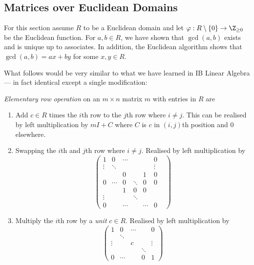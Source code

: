 \documentclass[a4paper]{article}
\theoremstyle{definition}
\begin{document}
\subsection{Matrices over Euclidean Domains}

For this section assume \(R\) to be a Euclidean domain and let \(\varphi: R \setminus \{0\} \to \Z_{\geq 0}\) be the Euclidean function. For \(a, b \in R\), we have shown that \(\gcd(a, b)\) exists and is unique up to associates. In addition, the Euclidean algorithm shows that \(\gcd(a, b) = ax + by\) for some \(x, y \in R\).

What follows would be very similar to what we have learned in IB Linear Algebra --- in fact identical except a single modification:

\begin{definition}
  \emph{Elementary row operation} on an \(m \times n\) matrix \(m\) with entries in \(R\) are
  \begin{enumerate}
  \item Add \(c \in R\) times the \(i\)th row to the \(j\)th row where \(i \neq j\). This can be realised by left multiplication by \(mI + C\) where \(C\) is \(c\) in \((i,j)\)th position and \(0\) elsewhere.
  \item Swapping the \(i\)th and \(j\)th row where \(i \neq j\). Realised by left multiplication by
  \[
    \begin{pmatrix}
      1 & 0 & \cdots & & & 0 \\
      \vdots & \ddots & & & & \vdots \\
      & & 0 & & 1 & 0 \\
      0 & \cdots & 0 & \ddots & 0 & 0 \\
      & & 1 & 0 & 0 & & \\
      \vdots & &&  \ddots & \\
      0 & & \cdots & & \cdots & 0
    \end{pmatrix}
  \]
\item Multiply the \(i\)th row by a \emph{unit} \(c \in R\). Realised by left multiplication by
  \[
    \begin{pmatrix}
      1 & 0 & \cdots & & 0 \\
       & \ddots & & & \\
      \vdots & & c & & \vdots \\
       & & & \ddots & \\
      0 & \cdots & & 0 & 1
    \end{pmatrix}
  \]
  \end{enumerate}
\end{definition}
\end{document}
